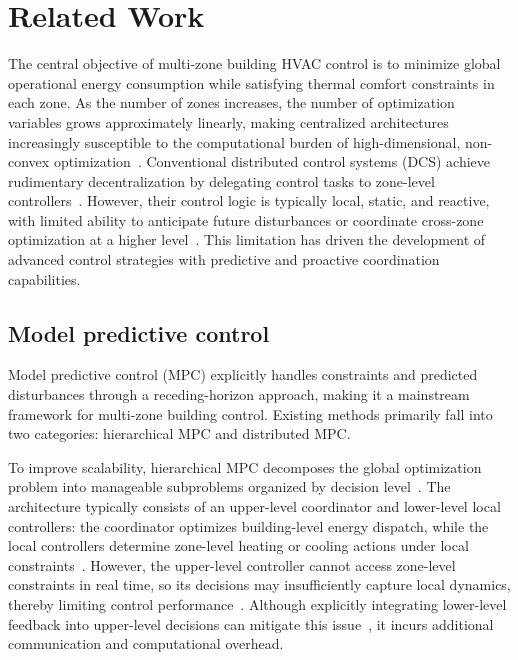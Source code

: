 \documentclass[a4paper]{cas-sc}
\begin{document}
\section{Related Work}
\label{sec:related_work}

The central objective of multi-zone building HVAC control is to minimize global operational energy consumption while satisfying thermal comfort constraints in each zone. As the number of zones increases, the number of optimization variables grows approximately linearly, making centralized architectures increasingly susceptible to the computational burden of high-dimensional, non-convex optimization~\cite{Wu2015-os,Asad2017-je,Lu2005-vy}. Conventional distributed control systems (DCS) achieve rudimentary decentralization by delegating control tasks to zone-level controllers~\cite{Coffin1999-ddc}. However, their control logic is typically local, static, and reactive, with limited ability to anticipate future disturbances or coordinate cross-zone optimization at a higher level~\cite{Wang2020-bb,Manjavacas2024-no}. This limitation has driven the development of advanced control strategies with predictive and proactive coordination capabilities.

\subsection{Model predictive control}

Model predictive control (MPC) explicitly handles constraints and predicted disturbances through a receding-horizon approach, making it a mainstream framework for multi-zone building control. Existing methods primarily fall into two categories: hierarchical MPC and distributed MPC.

To improve scalability, hierarchical MPC decomposes the global optimization problem into manageable subproblems organized by decision level~\cite{Rawlings2018-kk,Riccardo2009-sc}. The architecture typically consists of an upper-level coordinator and lower-level local controllers: the coordinator optimizes building-level energy dispatch, while the local controllers determine zone-level heating or cooling actions under local constraints~\cite{Engel2024-pm,Khatibi2023-vg}. However, the upper-level controller cannot access zone-level constraints in real time, so its decisions may insufficiently capture local dynamics, thereby limiting control performance~\cite{Engel2024-pm}. Although explicitly integrating lower-level feedback into upper-level decisions can mitigate this issue~\cite{Engel2022-js}, it incurs additional communication and computational overhead.
\end{document}
